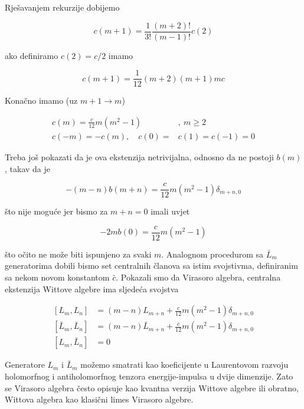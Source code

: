 \noindent Rješavanjem rekurzije dobijemo

\begin{equation*}
c(m+1)=\frac{1}{3!}\frac{(m+2)!}{(m-1)!}c(2)
\end{equation*}

\noindent ako definiramo $c(2)=c/2$ imamo

\begin{equation*}
c(m+1)=\frac{1}{12}(m+2)(m+1)m c
\end{equation*}

\noindent Konačno imamo (uz $m+1\to m$)

\begin{equation}
\begin{split}
c(m)=\frac{c}{12}m(m^2-1)&,\ m\ge 2\\
c(-m)=-c(m),\quad c(0)=&c(1)=c(-1)=0
\end{split}
\end{equation}

\noindent Treba još pokazati da je ova ekstenzija netrivijalna, odnosno da ne postoji $b(m)$, takav da je

\begin{equation*}
-(m-n)b(m+n)=\frac{c}{12}m(m^2-1)\delta_{m+n,0}
\end{equation*}

\noindent što nije moguće jer bismo za $m+n=0$ imali uvjet

\begin{equation*}
-2mb(0)=\frac{c}{12}m(m^2-1)
\end{equation*}

\noindent što očito ne može biti ispunjeno za svaki $m$. Analognom procedurom sa $\bar{L}_m$ generatorima dobili bismo set centralnih članova sa istim svojstivma, definiranim sa nekom novom konstantom $\bar{c}$. Pokazali smo da Virasoro algebra, centralna ekstenzija Wittove algebre ima sljedeća svojstva


\begin{equation}
\begin{split}
[L_m,L_n]&=(m-n)L_{m+n}+\frac{c}{12}m(m^2-1)\delta_{m+n,0}\\
[\bar{L}_m,\bar{L}_n]&=(m-n)\bar{L}_{m+n}+\frac{\bar{c}}{12}m(m^2-1)\delta_{m+n,0}\\
[L_m,\bar{L}_n]&=0
\end{split}
\end{equation}

\noindent Generatore $L_m$ i $\bar{L}_m$ možemo smatrati kao koeficijente u Laurentovom razvoju holomorfnog i antiholomorfnog tenzora energije-impulsa u dvije dimenzije. Zato se Virasoro algebra često opisuje kao kvantna verzija Wittove algebre ili obratno, Wittova algebra kao klasični limes Virasoro algebre.
